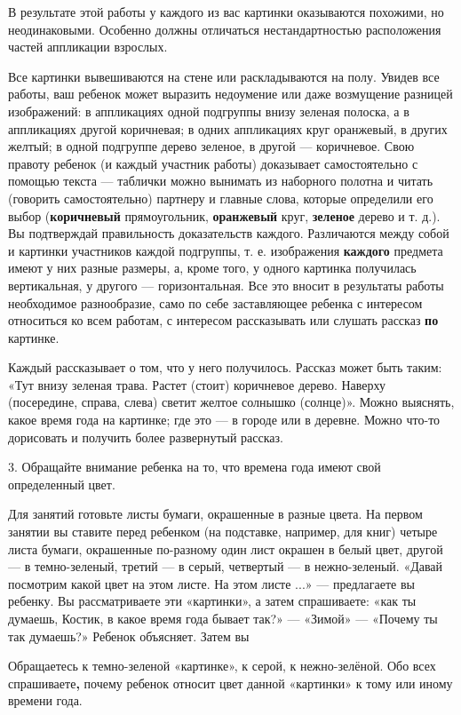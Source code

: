 \documentclass{book}
\begin{document}
В результате этой работы у каждого из вас картинки оказываются похожими,
но неодинаковыми. Особенно должны отличаться нестандартностью
расположения частей аппликации взрослых.

Все картинки вывешиваются на стене или раскладываются на полу. Увидев
все работы, ваш ребенок может выразить недоумение или даже возмущение
разницей изображений: в аппликациях одной подгруппы внизу зеленая
полоска, а в аппликациях другой коричневая; в одних аппликациях круг
оранжевый, в других желтый; в одной подгруппе дерево зеленое, в другой
--- коричневое. Свою правоту ребенок (и каждый участник работы)
доказывает самостоятельно с помощью текста --- таблички можно вынимать
из наборного полотна и читать (говорить самостоятельно) партнеру и
главные слова, которые определили его выбор (\textbf{коричневый}
прямоугольник, \textbf{оранжевый} круг, \textbf{зеленое} дерево и т.
д.). Вы подтверждай правильность доказательств каждого. Различаются
между собой и картинки участников каждой подгруппы, т. е. изображения
\textbf{каждого} предмета имеют у них разные размеры, а, кроме того, у
одного картинка получилась вертикальная, у другого --- горизонтальная.
Все это вносит в результаты работы необходимое разнообразие, само по
себе заставляющее ребенка с интересом относиться ко всем работам, с
интересом рассказывать или слушать рассказ \textbf{по} картинке.

Каждый рассказывает о том, что у него получилось. Рассказ может быть
таким: «Тут внизу зеленая трава. Растет (стоит) коричневое дерево.
Наверху (посередине, справа, слева) светит желтое солнышко (солнце)».
Можно выяснять, какое время года на картинке; где это --- в городе или в
деревне. Можно что-то дорисовать и получить более развернутый рассказ.

3. Обращайте внимание ребенка на то, что времена года имеют свой
определенный цвет.

Для занятий готовьте листы бумаги, окрашенные в разные цвета. На первом
занятии вы ставите перед ребенком (на подставке, например, для книг)
четыре листа бумаги, окрашенные по-разному один лист окрашен в белый
цвет, другой --- в темно-зеленый, третий --- в серый, четвертый --- в
нежно-зеленый. «Давай посмотрим какой цвет на этом листе. На этом листе
...» --- предлагаете вы ребенку. Вы рассматриваете эти «картинки», а
затем спрашиваете: «как ты думаешь, Костик, в какое время года бывает
так?» --- «Зимой» --- «Почему ты так думаешь?» Ребенок объясняет. Затем
вы

Обращаетесь к темно-зеленой «картинке», к серой, к нежно-зелёной. Обо
всех спрашиваете\textbf{,} почему ребенок относит цвет данной «картинки»
к тому или иному времени года.
\end{document}
